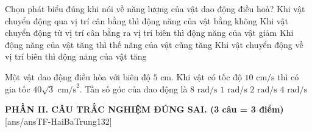 \begin{ex}%
	Chọn phát biểu đúng khi nói về năng lượng của vật dao động điều hoà?
	\choice
	{Khi vật chuyển động qua vị trí cân bằng thì động năng của vật bằng không}
	{\True Khi vật chuyển động từ vị trí cân bằng ra vị trí biên thì động năng của vật giảm}
	{Khi động năng của vật tăng thì thế năng của vật cũng tăng}
	{Khi vật chuyển động về vị trí biên thì động năng của vật tăng}
\end{ex}

\begin{ex}%
	Một vật dao động điều hòa với biên độ $5\text{ cm}$. Khi vật có tốc độ $10\text{ cm/s}$ thì có gia tốc $40\sqrt{3}\text{ cm/s}^2$. Tần số góc của dao động là
	\choice
	{$8\text{ rad/s}$}
	{$1\text{ rad/s}$}
	{$2\text{ rad/s}$}
	{\True $4\text{ rad/s}$}
\end{ex}


\noindent \textbf{PHẦN II. CÂU TRẮC NGHIỆM ĐÚNG SAI. (3 câu = 3 điểm)}
[ans/ansTF-HaiBaTrung132]

